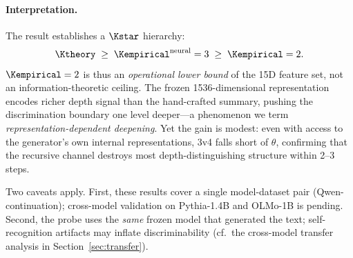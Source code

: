 \paragraph{Interpretation.}
The result establishes a $\Kstar$ hierarchy:
\[
  \Ktheory \;\geq\; \Kempirical^{\text{neural}} = 3 \;\geq\; \Kempirical = 2.
\]
$\Kempirical = 2$ is thus an \emph{operational lower bound} of the 15D feature set, not an information-theoretic ceiling.
The frozen 1536-dimensional representation encodes richer depth signal than the hand-crafted summary, pushing the discrimination boundary one level deeper---a phenomenon we term \emph{representation-dependent deepening}.
Yet the gain is modest: even with access to the generator's own internal representations, 3v4 falls short of $\theta$, confirming that the recursive channel destroys most depth-distinguishing structure within 2--3 steps.%

Two caveats apply.
First, these results cover a single model-dataset pair (Qwen-continuation); cross-model validation on Pythia-1.4B and OLMo-1B is pending.
Second, the probe uses the \emph{same} frozen model that generated the text; self-recognition artifacts may inflate discriminability (cf.\ the cross-model transfer analysis in Section~\ref{sec:transfer}).


